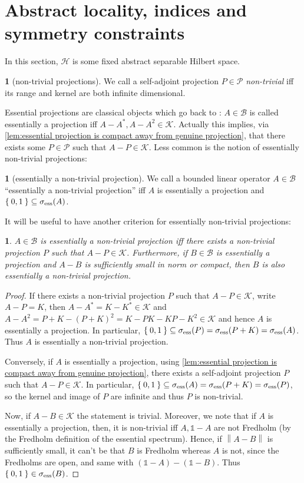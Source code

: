 \documentclass[a4paper,10pt]{article}
\numberwithin{equation}{section}
\theoremstyle{plain}
\theoremstyle{plain}
\newtheorem{lem}[thm]{\protect\lemmaname}
\theoremstyle{plain}
\theoremstyle{plain}
\theoremstyle{plain}
\theoremstyle{remark}
\theoremstyle{definition}
\newtheorem{defn}[thm]{\protect\definitionname}
\theoremstyle{plain}
\providecommand{\definitionname}{Definition}
\providecommand{\lemmaname}{Lemma}
\newcommand{\calB}{\mathcal{B}}
\newcommand{\calH}{\mathcal{H}}
\newcommand{\calK}{\mathcal{K}}
\newcommand{\calP}{\mathcal{P}}
\newcommand\norm[1]{\left\lVert#1\right\rVert}
\newcommand{\Id}{\mathds{1}}
\begin{document}
	\section{Abstract locality, indices and symmetry constraints}\label{sec:locality and symmetry}
	In this section, $\calH$ is some fixed abstract separable Hilbert space.
	
	\begin{defn}[non-trivial projections]\label{def:non trivial projections} We call a self-adjoint projection $P\in\calP$ \emph{non-trivial} iff its range and kernel are both infinite dimensional.
	\end{defn}
	Essential projections are classical objects which go back to \cite{Calkin1941}: $A\in\calB$ is called essentially a projection iff $A-A^\ast,A-A^2\in\calK$. Actually this implies, via \cref{lem:essential projection is compact away from genuine projection}, that there exists some $P\in\calP$ such that $A-P\in\calK$. Less common is the notion of essentially non-trivial projections:
	\begin{defn}[essentially a non-trivial projection]
		We call a bounded linear operator $A\in\calB$ ``essentially a non-trivial projection'' iff $A$ is essentially a projection and $\Set{0,1}\subseteq\sigma_{\mathrm{ess}}(A)$. 
	\end{defn}
	It will be useful to have another criterion for essentially non-trivial projections:
	\begin{lem}\label{lem:stability of essentially non trivial projections}
		$A\in\calB$ is essentially a non-trivial projection iff there exists a non-trivial projection $P$ such that $A-P\in\calK$. Furthermore, if $B\in\calB$ is essentially a projection and $A-B$ is sufficiently small in norm or compact, then $B$ is also essentially a non-trivial projection.
	\end{lem}
	\begin{proof}
		If there exists a non-trivial projection $P$ such that $A-P\in\calK$, write $A-P=K$, then $A-A^*=K-K^*\in\calK$ and $A-A^2=P+K-(P+K)^2=K-PK-KP-K^2\in\calK$ and hence $A$ is essentially a projection. In particular, $\Set{0,1}\subseteq \sigma_{\mathrm{ess}}(P)=\sigma_{\mathrm{ess}}(P+K)=\sigma_{\mathrm{ess}}(A)$. Thus $A$ is essentially a non-trivial projection.
		
		Conversely, if $A$ is essentially a projection, using \cref{lem:essential projection is compact away from genuine projection}, there exists a self-adjoint projection $P$ such that $A-P\in\calK$. In particular, $\Set{0,1}\subseteq \sigma_{\mathrm{ess}}(A)=\sigma_{\mathrm{ess}}(P+K)=\sigma_{\mathrm{ess}}(P)$, so the kernel and image of $P$ are infinite and thus $P$ is non-trivial.
		
		Now, if $A-B\in\calK$ the statement is trivial. Moreover, we note that if $A$ is essentially a projection, then, it is non-trivial iff $A,\Id-A$ are not Fredholm (by the Fredholm definition of the essential spectrum). Hence, if $\norm{A-B}$ is sufficiently small, it can't be that $B$ is Fredholm whereas $A$ is not, since the Fredholms are open, and same with $(\Id-A)-(\Id-B)$. Thus $\Set{0,1}\in \sigma_{\mathrm{ess}}(B)$.
	\end{proof}
	
\end{document}
